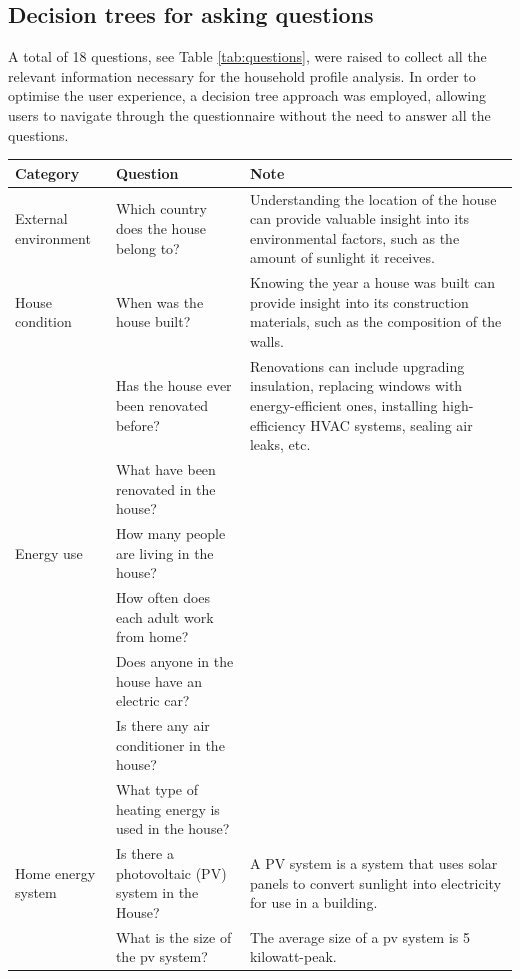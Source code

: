 \subsection{Decision trees for asking questions}

A total of 18 questions, see Table \ref{tab:questions}, were raised to collect all the relevant information necessary for the household profile analysis. 
In order to optimise the user experience, a decision tree approach was employed, allowing users to navigate through the questionnaire without the need to answer all the questions. 

\begin{center}
    \small
    \begin{longtable}{ | p{} | p{} | p{} | }
        \hline
        Category & Question & Note \\
        \hline
        External environment & Which country does the house belong to? & Understanding the location of the house can provide valuable insight into its environmental factors, such as the amount of sunlight it receives. \\
        \hline
        House condition & When was the house built? & Knowing the year a house was built can provide insight into its construction materials, such as the composition of the walls. \\
          & Has the house ever been renovated before? & Renovations can include upgrading insulation, replacing windows with energy-efficient ones, installing high-efficiency HVAC systems, sealing air leaks, etc. \\
          & What have been renovated in the house? &   \\
          \hline
        Energy use & How many people are living in the house? &   \\
          & How often does each adult work from home? &   \\
          & Does anyone in the house have an electric car? &   \\
          & Is there any air conditioner in the house? &   \\
          & What type of heating energy is used in the house? &   \\
          \hline
        Home energy system  & Is there a photovoltaic (PV) system in the House? & A PV system is a system that uses solar panels to convert sunlight into electricity for use in a building. \\    
          & What is the size of the \gls{pv} system? &  The average size of a \gls{pv} system is 5 kilowatt-peak. \\

\end{longtable}
\end{center}
